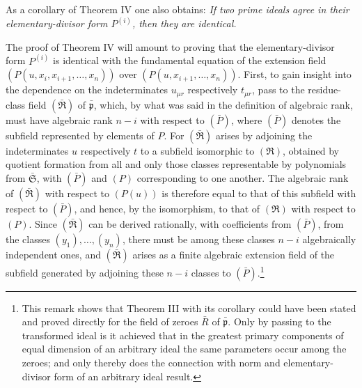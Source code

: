 \documentclass[11pt]{article}
\providecommand{\mR}{\mathfrak{R}}
\providecommand{\frakS}{\mathfrak S}
\providecommand{\frakp}{\mathfrak p}
\providecommand{\mR}{\mathfrak{R}}
\providecommand{\frakp}{\mathfrak p}
\providecommand{\frakp}{\mathfrak p}
\providecommand{\frakS}{\mathfrak S}
\begin{document}
As a corollary of Theorem IV one also obtains: \emph{If two prime ideals agree in their elementary-divisor form $P^{(i)}$, then they are identical.}

The proof of Theorem IV will amount to proving that the elementary-divisor form $P^{(i)}$ is identical with the fundamental equation of the extension field $(P(u,x_i,x_{i+1},\ldots,x_n))$ over $(P(u,x_{i+1},\ldots,x_n))$. First, to gain insight into the dependence on the indeterminates $u_{\mu r}$ respectively $t_{\mu r}$, pass to the residue-class field $(\bar{\mR})$ of $\bar{\frakp}$, which, by what was said in the definition of algebraic rank, must have algebraic rank $n-i$ with respect to $(\bar P)$, where $(\bar P)$ denotes the subfield represented by elements of $P$. For $(\bar{\mR})$ arises by adjoining the indeterminates $u$ respectively $t$ to a subfield isomorphic to $(\mR)$, obtained by quotient formation from all and only those classes representable by polynomials from $\bar{\frakS}$, with $(\bar P)$ and $(P)$ corresponding to one another. The algebraic rank of $(\bar{\mR})$ with respect to $(P(u))$ is therefore equal to that of this subfield with respect to $(\bar P)$, and hence, by the isomorphism, to that of $(\mR)$ with respect to $(P)$. Since $(\bar{\mR})$ can be derived rationally, with coefficients from $(\bar P)$, from the classes $(y_1),\ldots,(y_n)$, there must be among these classes $n-i$ algebraically independent ones, and $(\bar{\mR})$ arises as a finite algebraic extension field of the subfield generated by adjoining these $n-i$ classes to $(\bar P)$.\footnote{This remark shows that Theorem III with its corollary could have been stated and proved directly for the field of zeroes $\bar R$ of $\bar{\frakp}$. Only by passing to the transformed ideal is it achieved that in the greatest primary components of equal dimension of an arbitrary ideal the same parameters occur among the zeroes; and only thereby does the connection with norm and elementary-divisor form of an arbitrary ideal result.}
\end{document}
